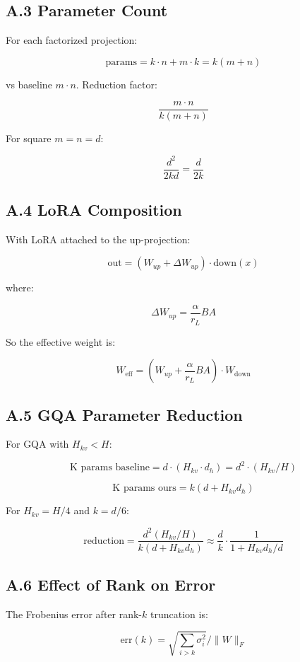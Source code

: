 \subsection{A.3 Parameter Count}

For each factorized projection:

\[
\text{params} = k \cdot n + m \cdot k = k(m + n)
\]

vs baseline $m \cdot n$. Reduction factor:

\[
\frac{m \cdot n}{k(m + n)}
\]

For square $m = n = d$:

\[
\frac{d^2}{2kd} = \frac{d}{2k}
\]

\subsection{A.4 LoRA Composition}

With LoRA attached to the up-projection:

\[
\text{out} = (W_{up} + \Delta W_{up}) \cdot \text{down}(x)
\]

where:

\[
\Delta W_{up} = \frac{\alpha}{r_L} B A
\]

So the effective weight is:

\[
W_\text{eff} = (W_{up} + \frac{\alpha}{r_L} B A) \cdot W_\text{down}
\]

\subsection{A.5 GQA Parameter Reduction}

For GQA with $H_{kv} < H$:

\[
\text{K params baseline} = d \cdot (H_{kv} \cdot d_h) = d^2 \cdot (H_{kv}/H)
\]

\[
\text{K params ours} = k(d + H_{kv} d_h)
\]

For $H_{kv} = H/4$ and $k = d/6$:

\[
\text{reduction} = \frac{d^2 (H_{kv}/H)}{k(d + H_{kv} d_h)} \approx \frac{d}{k} \cdot \frac{1}{1 + H_{kv} d_h / d}
\]

\subsection{A.6 Effect of Rank on Error}

The Frobenius error after rank-$k$ truncation is:

\[
\text{err}(k) = \sqrt{\sum_{i > k} \sigma_i^2} / \|W\|_F
\]

